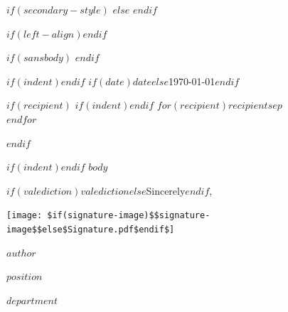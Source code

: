 \documentclass[
$if(papersize)$
$papersize$paper,
$else$
letterpaper,
$endif$,
11pt,
oneside$if(classoption)$,$endif$
$for(classoption)$
$classoption$$sep$,
$endfor$
]{article}
\begin{document}
$if(secondary-style)$
$else$
$endif$
\afterpage{\aftergroup\restoregeometry}

\thispagestyle{firstheader}  %
\pagestyle{defaultheader}  %

$if(left-align)$\RaggedRight$endif$


$if(sansbody)$
\sffamily
$endif$

$if(indent)$\noindent$endif$
$if(date)$$date$$else$\today$endif$
\smallskip

$if(recipient)$
$if(indent)$\noindent$endif$
$for(recipient)$$recipient$$sep$\\$endfor$
\par
$endif$

\smallskip

$if(indent)$\noindent$endif$  %
$body$

\bigskip
\hspace{.5\textwidth}
\begin{minipage}[]{3.2in}
  $if(valediction)$$valediction$$else$Sincerely$endif$,\par
  \texttt{[image: \$if(signature-image)\$\$signature-image\$\$else\$Signature.pdf\$endif\$]}\par
  \singlespace
  $author$\par
  $position$\par
  $department$\par
\end{minipage}
\end{document}
